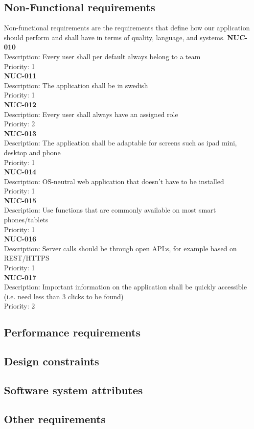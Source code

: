 \subsection{Non-Functional requirements}
Non-functional requirements are the requirements that define how our application should perform and shall have in terms of quality, language, and systems.
\newline
\newline
\textbf{NUC-010} \\
Description: Every user shall per default always belong to a team \\
Priority: 1 \\
\newline
\textbf{NUC-011} \\
Description: The application shall be in swedish\\
Priority: 1 \\
\newline
\textbf{NUC-012} \\
Description: Every user shall always have an assigned role \\
Priority: 2 \\
\newline
\textbf{NUC-013} \\
Description: The application shall be adaptable for screens such as ipad mini, desktop and phone \\
Priority: 1 \\
\newline
\textbf{NUC-014} \\
Description: OS-neutral web application that doesn’t have to be installed\\
Priority: 1 \\
\newline
\textbf{NUC-015} \\
Description: Use functions that are commonly available on most smart phones/tablets\\
Priority: 1 \\
\newline
\textbf{NUC-016} \\
Description: Server calls should be through open API:s, for example based on REST/HTTPS \\
Priority: 1 \\
\newline
\textbf{NUC-017} \\
Description: Important information on the application shall be quickly accessible (i.e. need less than 3 clicks to be found)  \\
Priority: 2 \\
\newline

\subsection{Performance requirements}
\subsection{Design constraints}
\subsection{Software system attributes}
\subsection{Other requirements}
